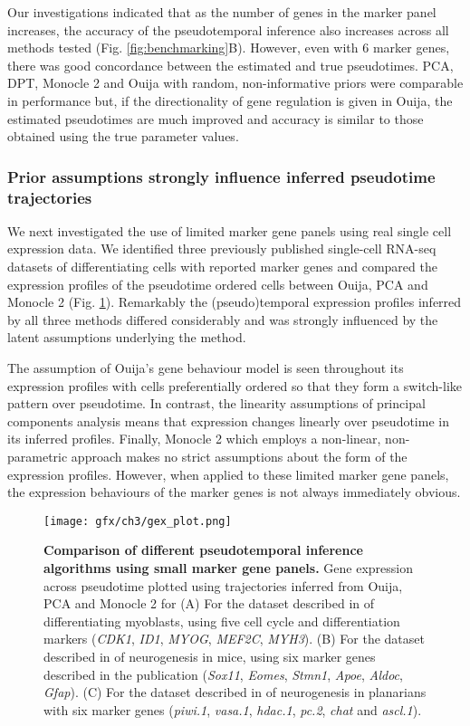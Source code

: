 Our investigations indicated that as the number of genes in the marker panel increases, the accuracy of the pseudotemporal inference also increases across all methods tested (Fig. \ref{fig:benchmarking}B). However, even with 6 marker genes, there was good concordance between the estimated and true pseudotimes. PCA, DPT, Monocle 2 and Ouija with random, non-informative priors were comparable in performance but, if the directionality of gene regulation is given in Ouija, the estimated pseudotimes are much improved and accuracy is similar to those obtained using the true parameter values.

\subsubsection{Prior assumptions strongly influence inferred pseudotime trajectories}

We next investigated the use of limited marker gene panels using real single cell expression data. We identified three previously published single-cell RNA-seq datasets of differentiating cells with reported marker genes and compared the expression profiles of the pseudotime ordered cells between Ouija, PCA and Monocle 2 (Fig. \ref{fig:panels}). Remarkably the (pseudo)temporal expression profiles inferred by all three methods differed considerably and was strongly influenced by the latent assumptions underlying the method.

The assumption of Ouija's gene behaviour model is seen throughout its expression profiles with cells preferentially ordered so that they form a  switch-like pattern over pseudotime. In contrast, the linearity assumptions of principal components analysis means that expression changes linearly over pseudotime in its inferred profiles. Finally, Monocle 2 which employs a non-linear, non-parametric approach makes no strict assumptions about the form of the expression profiles. However, when applied to these limited marker gene panels, the expression behaviours of the marker genes is not always immediately obvious.

\begin{figure}[!t]
	\centering
	\texttt{[image: gfx/ch3/gex\_plot.png]}
	\caption{{\bf Comparison of different pseudotemporal inference algorithms using small marker gene panels.}
	Gene expression across pseudotime plotted using trajectories inferred from Ouija, PCA and Monocle 2 for
	(A) For the dataset described in \cite{Trapnell2014} of differentiating myoblasts, using five cell cycle and differentiation markers (\emph{CDK1}, \emph{ID1}, \emph{MYOG}, \emph{MEF2C}, \emph{MYH3}).
	(B) For the dataset described in \cite{Shin2015} of neurogenesis in mice, using six marker genes described in the publication (\emph{Sox11}, \emph{Eomes}, \emph{Stmn1}, \emph{Apoe}, \emph{Aldoc}, \emph{Gfap}).
	(C) For the dataset described in \cite{molinaro2016silico} of neurogenesis in planarians with six marker genes (\emph{piwi.1}, \emph{vasa.1}, \emph{hdac.1}, \emph{pc.2}, \emph{chat} and \emph{ascl.1}).
	}
	\label{fig:panels}
\end{figure}


